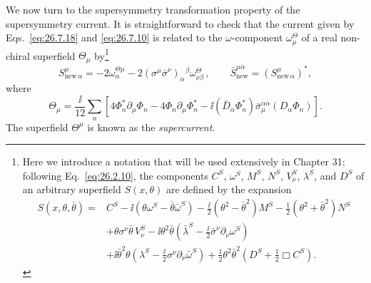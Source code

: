 We now turn to the supersymmetry transformation property of the
supersymmetry current. It is straightforward to check that the current given
by Eqs.~\eqref{eq:26.7.18} and \eqref{eq:26.7.10} is related to the
\(\omega\)-component \(\omega_\mu^\Theta\) of a real non-chiral superfield
\(\Theta_\mu\) by\footnote{Here we introduce a notation that will be used
extensively in Chapter 31; following Eq.~\eqref{eq:26.2.10}, the components
\(C^S\), \(\omega^S\), \(M^S\), \(N^S\), \(V_\nu^S\), \(\lambda^S\), and
\(D^S\) of an arbitrary superfield \(S(x,\theta)\) are defined by the
expansion
\[
  \begin{aligned}
  S(x,\theta,\bar\theta)={}&C^S
  -\ii(\theta\omega^S-\bar\theta\bar\omega^S)
  -\frac{\ii}{2}(\theta^2-\bar\theta^2)M^S
  -\frac12(\theta^2+\bar\theta^2)N^S\\
  &+\theta\sigma^\nu\bar\theta\,V_\nu^S
  -\ii\theta^2\bar\theta
    \left(\bar\lambda^S-\frac{\ii}{2}
      \bar\sigma^\nu\partial_\nu\omega^S\right)\\
  &+\ii\bar\theta^2\theta
    \left(\lambda^S-\frac{\ii}{2}
      \sigma^\nu\partial_\nu\bar\omega^S\right)
  +\frac12\theta^2\bar\theta^2
    \left(D^S+\frac12\Box C^S\right).
  \end{aligned}
\]}
\begin{equation}
  S_{\mathrm{new}\,\alpha}^\mu
  =-2\omega_\alpha^{\Theta\mu}
   -2(\sigma^\mu\bar\sigma^\nu)_\alpha{}^\beta
     \omega_{\nu\beta}^\Theta\,,
  \qquad
  \bar S_{\mathrm{new}}^{\mu\dot\alpha}
  =(S_{\mathrm{new}\,\alpha}^\mu)^* ,
  \tag{26.7.20}\label{eq:26.7.20}
\end{equation}
where
\begin{equation}
  \Theta_\mu
  =\frac{\ii}{12}\sum_n\left[
    4\Phi_n^*\partial_\mu\Phi_n
    -4\Phi_n\partial_\mu\Phi_n^*
    -\ii(\bar D_{\dot\alpha}\Phi_n^*)
       \bar\sigma_\mu^{\dot\alpha\alpha}(D_\alpha\Phi_n)
  \right].
  \tag{26.7.21}\label{eq:26.7.21}
\end{equation}
The superfield \(\Theta^\mu\) is known as the \emph{supercurrent}.


